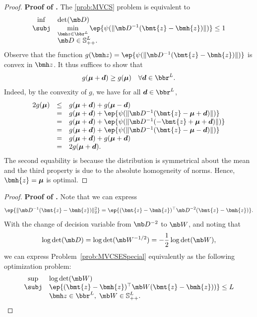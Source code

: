 \documentclass[opre, blindrev]{informs4}
\newcommand{\1}[1]{\mathds{1}{\left(#1\right)}}
\begin{document}
\begin{appendices}
\begin{proof}{\bf Proof of .}
The \ref{prob:MVCS} problem is equivalent to
\begin{equation}
\label{prob:MVCSESpecialSym2}
\begin{array}{cll}
\inf & \displaystyle\det({\mb D}) \\
\subj & \displaystyle\displaystyle \min_{\bmh z  \in \bbr^L} \ep{ \psi(\|\mb D^{-1} ( \bmt{z} - \bmh{z} ) \| )} \leq 1 \\
& \displaystyle{\mb D} \in \mathbb{S}^L_{++}.
\end{array}  
\end{equation}
Observe that the function $g(\bmh z) = \ep{ \psi(\| \mb D^{-1} ( \bmt{z} - \bmh{z} ) \|)}$
is convex in $\bmh z$. It thus suffices to show that 
$$
g(\bm \mu + \bm d) \geq g(\bm \mu) ~~~\forall \bm d \in \bbr^L. 
$$
Indeed, by the convexity of $g$, we have for all $\bm d \in \bbr^L$, 
$$
\begin{array}{rcl}
2g(\bm \mu) & \leq & g(\bm \mu + \bm d) +g(\bm \mu - \bm d) \\
&=& g(\bm \mu + \bm d)  + \ep{\psi(\|\mb D^{-1}(\bmt{z} - \bm{\mu} + \bm d)\|)} \\
&=& g(\bm \mu + \bm d) + \ep{\psi(\|\mb D^{-1}(-\bmt{z} + \bm{\mu} + \bm d)\|)} \\
&=& g(\bm \mu + \bm d) + \ep{\psi(\|\mb D^{-1}(\bmt{z} - \bm{\mu} - \bm d)\|)} \\
&=& g(\bm \mu + \bm d) + g(\bm \mu + \bm d) \\
&=& 2g(\bm \mu + \bm d). 
\end{array}
$$
The second equability is because the distribution is symmetrical about the mean and the third property is due to the absolute homogeneity of norms. Hence, $\bmh{z} = \bm{\mu}$ is optimal.
\hfill \Halmos
\end{proof}
\vspace{3mm}

\begin{proof}{\bf Proof of .}
Note that we can express 
$$
\ep{\|\mb D^{-1}(\bmt{z} - \bmh{z})\|^2_2} = \ep{(\bmt{z} - \bmh{z})^\top{\mb D}^{-2}(\bmt{z} - \bmh{z})}.
$$
With the change of decision variable from $\mb D^{-2}$ to ${\mb W}$, and noting that 
$$
\log \det(\mb D) = \log \det({\mb W^{-1/2}}) = -\frac{1}{2} \log \det(\mb W),
$$ 
we can express Problem~\eqref{prob:MVCSESpecial} equivalently as the following optimization problem:
\begin{equation}
\label{prob:MVCSESpecialTmp1}
\begin{array}{cll}
\sup & \log\det({\mb W}) \\
\subj & \ep{(\bmt{z} - \bmh{z})^\top{\mb W} (\bmt{z} - \bmh{z}))} \leq L \\
& \bmh z \in \bbr^L, \; \displaystyle{\mb W} \in \mathbb{S}^L_{++}.
\end{array}  
\end{equation}


\end{proof}
\end{appendices}
\end{document}
